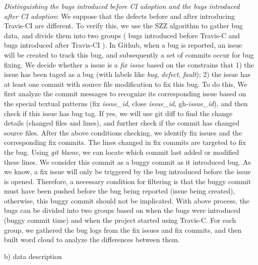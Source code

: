 \textit{Distinguishing the bugs introduced before CI adoption and the bugs introduced after CI adoption}: 
We suppose that the defects before and after introducing Travis-CI are different. To verify this, we use the SZZ algorithm to gather bug data, and divide them into two groups ( \ie bugs introduced before Travis-C and bugs introduced after Travis-CI ).
In Github, when a bug is reported, an issue will be created to track this bug, and subsequently a set of commits occur for bug fixing. 
We decide whether a issue is a \textit{fix issue} based on the constrains that 1) the issue has been taged as a bug (with labels like \textit{bug}, \textit{defect}, \textit{fault}); 2) the issue has at least one commit with source file modification to fix this bug. To do this, We first analyze the commit messages to recognize its corresponding issue based on the special textual patterns (\eg fix \textit{issue\_id}, close \textit{issue\_id}, gh-\textit{issue\_id}), and then check if this issue has bug tag. If yes, we will use git diff to find the change details (\ie changed files and lines), and further check if the commit has changed source files.
After the above conditions checking, we identify fix issues and the corresponding fix commits. The lines changed in fix commits are targeted to fix the bug. Using \textit{git blame}, we can locate which commit last added or modified these lines. We consider this commit as a buggy commit as it introduced bug. 
As we know, a fix issue will only be triggered by the bug introduced before the issue is opened. Therefore, a necessary condition for filtering is that the buggy commit must have been pushed before the bug being reported (\ie issue being created), otherwise, this buggy commit should not be implicated.
With above process, the bugs can be divided into two groups based on when the bugs were introduced (\ie buggy commit time) and when the project started using Travis-C. For each group, we gathered the bug logs from the fix issues and fix commits, and then built word cloud to analyze the differences between them.

 
b) data description



